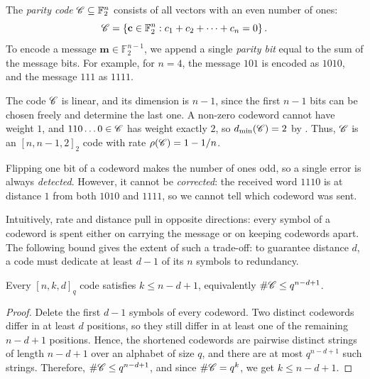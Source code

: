 \documentclass[../../book]{subfiles}
\begin{document}
\begin{example}\label{ex:parity}
  The \emph{parity code} $\mathscr{C} \subseteq \mathbb{F}_2^n$ consists of all vectors with an even number of ones:
  \begin{equation*}
    \mathscr{C} = \left\{ \mathbf{c} \in \mathbb{F}_2^n : c_1 + c_2 + \dots + c_n = 0 \right\}.
  \end{equation*}
  To encode a message $\mathbf{m} \in \mathbb{F}_2^{n-1}$, we append a single \emph{parity bit} equal to the sum of the message bits.
  For example, for $n = 4$, the message $101$ is encoded as $1010$, and the message $111$ as $1111$.

  The code $\mathscr{C}$ is linear, and its dimension is $n-1$, since the first $n-1$ bits can be chosen freely and determine the last one.
  A non-zero codeword cannot have weight $1$, and $110\ldots0 \in \mathscr{C}$ has weight exactly $2$, so $d_{\min}(\mathscr{C}) = 2$ by .
  Thus, $\mathscr{C}$ is an $[n, n-1, 2]_2$ code with rate $\rho(\mathscr{C}) = 1 - 1/n$.

  Flipping one bit of a codeword makes the number of ones odd, so a single error is always \emph{detected}.
  However, it cannot be \emph{corrected}: the received word $1110$ is at distance $1$ from both $1010$ and $1111$, so we cannot tell which codeword was sent.
\end{example}

Intuitively, rate and distance pull in opposite directions: every symbol of a codeword is spent either on carrying the message or on keeping codewords apart.
The following bound gives the extent of such a trade-off: to guarantee distance $d$, a code must dedicate at least $d-1$ of its $n$ symbols to redundancy.

\begin{proposition}\label{prop:singleton}
  Every $[n,k,d]_q$ code satisfies $k \leq n-d+1$, equivalently $\#\mathscr{C} \leq q^{n-d+1}$.
\end{proposition}

\begin{proof}
  Delete the first $d-1$ symbols of every codeword.
  Two distinct codewords differ in at least $d$ positions, so they still differ in at least one of the remaining $n-d+1$ positions.
  Hence, the shortened codewords are pairwise distinct strings of length $n-d+1$ over an alphabet of size $q$, and there are at most $q^{n-d+1}$ such strings.
  Therefore, $\#\mathscr{C} \leq q^{n-d+1}$, and since $\#\mathscr{C} = q^k$, we get $k \leq n-d+1$.
\end{proof}
\end{document}
